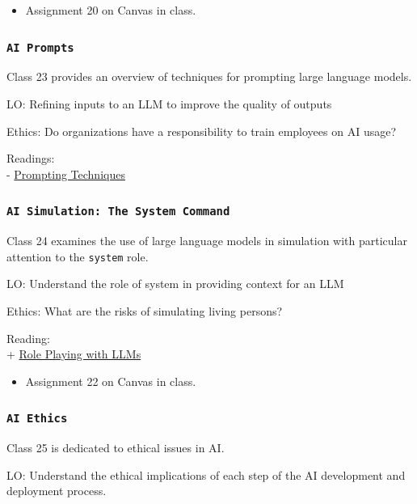 \documentclass[11pt,]{article}
\begin{document}
\begin{itemize}
\item Assignment 20 on Canvas in class.
\end{itemize}

\subsubsection{\texorpdfstring{\texttt{AI\ Prompts}}{AI Prompts}}\label{ai-prompts}

Class 23 provides an overview of techniques for prompting large language
models.

LO: Refining inputs to an LLM to improve the quality of outputs

Ethics: Do organizations have a responsibility to train employees on AI
usage?

Readings:\\
- \href{https://www.promptingguide.ai/techniques}{Prompting Techniques}

\subsubsection{\texorpdfstring{\texttt{AI\ Simulation:\ The\ System\ Command}}{AI Simulation: The System Command}}\label{ai-simulation-the-system-command}

Class 24 examines the use of large language models in simulation with
particular attention to the \texttt{system} role.

LO: Understand the role of system in providing context for an LLM

Ethics: What are the risks of simulating living persons?

Reading:\\
+ \href{https://www.nature.com/articles/s41586-023-06647-8}{Role Playing
with LLMs}

\begin{itemize}
\item Assignment 22 on Canvas in class.
\end{itemize}

\subsubsection{\texorpdfstring{\texttt{AI\ Ethics}}{AI Ethics}}\label{ai-ethics}

Class 25 is dedicated to ethical issues in AI.

LO: Understand the ethical implications of each step of the AI
development and deployment process.
\end{document}
